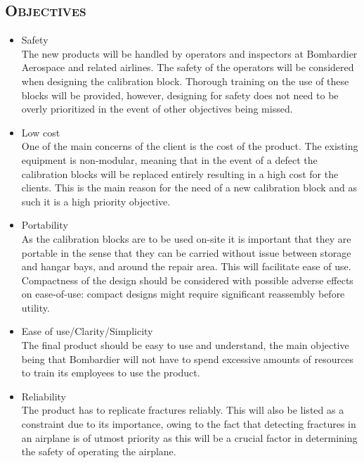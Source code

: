 \documentclass[12pt]{article}
\begin{document}
\subsection{\textsc{Objectives} }
\begin{itemize}

\item Safety \hfill \\ 
The new products will be handled by operators and inspectors at Bombardier Aerospace and related airlines. The safety of the operators will be considered when designing the calibration block. Thorough training on the use of these blocks will be provided, however, designing for safety does not need to be overly prioritized in the event of other objectives being missed.

\item Low cost \hfill \\
One of the main concerns of the client is the cost of the product. The existing equipment is non-modular, meaning that in the event of a defect the calibration blocks will be replaced entirely resulting in a high cost for the clients. This is the main reason for the need of a new calibration block and as such it is a high priority objective.
		
\item Portability \hfill \\
As the calibration blocks are to be used on-site it is important that they are portable in the sense that they can be carried without issue between storage and hangar bays, and around the repair area. This will facilitate ease of use. Compactness of the design should be considered with possible adverse effects on ease-of-use: compact designs might require significant reassembly before utility.

\item Ease of use/Clarity/Simplicity \hfill \\
The final product should be easy to use and understand, the main objective being that Bombardier will not have to spend excessive amounts of resources to train its employees to use the product.

\item Reliability \hfill \\
The product has to replicate fractures reliably. This will also be listed as a constraint due to its importance, owing to the fact that detecting fractures in an airplane is of utmost priority as this will be a crucial factor in determining the safety of operating the airplane.		


\end{itemize}
\end{document}
